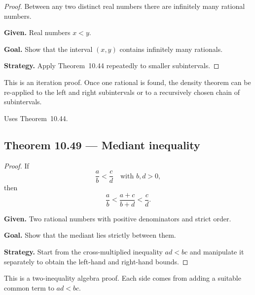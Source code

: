 \begin{proof}
\Claim Between any two distinct real numbers there are infinitely many rational numbers.

\textbf{Given.} Real numbers $x<y$.

\textbf{Goal.} Show that the interval $(x,y)$ contains infinitely many rationals.

\textbf{Strategy.} Apply Theorem~10.44 repeatedly to smaller subintervals.


\end{proof}

\begin{remark*}
This is an iteration proof.  Once one rational is found, the density theorem can
be re-applied to the left and right subintervals or to a recursively chosen chain
of subintervals.
\end{remark*}

\begin{remark*}[Dependencies]
Uses Theorem~10.44.
\end{remark*}


\subsection*{Theorem 10.49 — Mediant inequality}
\label{prf:grep-mediant-inequality}

\begin{proof}
\Claim If
\[
\frac{a}{b} < \frac{c}{d}
\quad\text{with } b,d>0,
\]
then
\[
\frac{a}{b} < \frac{a+c}{b+d} < \frac{c}{d}.
\]

\textbf{Given.} Two rational numbers with positive denominators and strict order.

\textbf{Goal.} Show that the mediant lies strictly between them.

\textbf{Strategy.} Start from the cross-multiplied inequality $ad<bc$ and manipulate it separately to obtain the left-hand and right-hand bounds.


\end{proof}

\begin{remark*}
This is a two-inequality algebra proof.  Each side comes from adding a suitable
common term to $ad<bc$.
\end{remark*}

